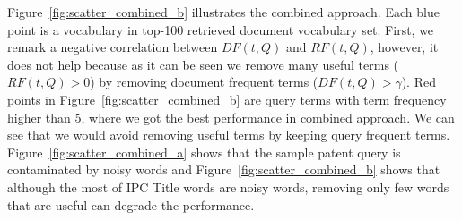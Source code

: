 Figure~\ref{fig:scatter_combined_b} illustrates the combined approach. Each blue point is a vocabulary in top-100 retrieved document vocabulary set. First, we remark a negative correlation between $\mathit{DF(t, Q)}$ and $\mathit{RF(t, Q)}$, however, it does not help because as it can be seen we remove many useful terms ($RF(t, Q)>0$) by removing document frequent terms ($DF(t, Q)>\gamma$). Red points in Figure~\ref{fig:scatter_combined_b} are query terms with term frequency higher than 5, where we got the best performance in combined approach. We can see that we would avoid removing useful terms by keeping query frequent terms. Figure~\ref{fig:scatter_combined_a} shows that the sample patent query is contaminated by noisy words and Figure~\ref{fig:scatter_combined_b} shows that although the most of IPC Title words are noisy words, removing only few words that are useful can degrade the performance.    
